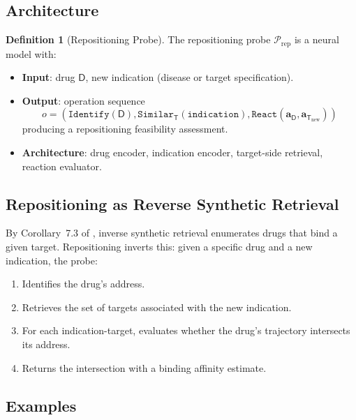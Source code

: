 \documentclass[11pt,twocolumn,a4paper]{article}
\theoremstyle{definition}
\newtheorem{definition}[theorem]{Definition}
\theoremstyle{remark}
\newcommand{\probe}{\mathcal{P}}
\newcommand{\drugaddr}{\mathbf{a}_{\mathsf{D}}}
\newcommand{\targaddr}{\mathbf{a}_{\mathsf{T}}}
\begin{document}
\subsection{Architecture}

\begin{definition}[Repositioning Probe]
\label{def:repositioning_probe}
The repositioning probe $\probe_{\mathrm{rep}}$ is a neural model with:
\begin{itemize}[nosep,leftmargin=*]
\item \textbf{Input}: drug $\mathsf{D}$, new indication (disease or target specification).
\item \textbf{Output}: operation sequence
\begin{equation*}
o = (\texttt{Identify}(\mathsf{D}), \texttt{Similar}_\mathsf{T}(\texttt{indication}), \texttt{React}(\drugaddr, \targaddr_{\mathrm{new}}))
\end{equation*}
producing a repositioning feasibility assessment.
\item \textbf{Architecture}: drug encoder, indication encoder, target-side retrieval, reaction evaluator.
\end{itemize}
\end{definition}

\subsection{Repositioning as Reverse Synthetic Retrieval}

By Corollary~7.3 of \citep{sachikonye2025e}, inverse synthetic retrieval enumerates drugs that bind a given target. Repositioning inverts this: given a specific drug and a new indication, the probe:
\begin{enumerate}[nosep,label=(\alph*)]
\item Identifies the drug's address.
\item Retrieves the set of targets associated with the new indication.
\item For each indication-target, evaluates whether the drug's trajectory intersects its address.
\item Returns the intersection with a binding affinity estimate.
\end{enumerate}

\subsection{Examples}
\end{document}
